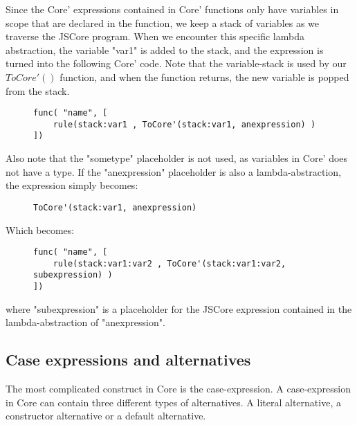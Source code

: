 Since the Core' expressions contained in Core' functions only have variables in 
scope that are declared in the function, we keep a stack of variables as we traverse
the JSCore program. When we encounter this specific lambda abstraction, the variable
"var1" is added to the stack, and the expression is turned into the following Core' code. 
Note that the variable-stack is used by our $ToCore'()$ function, and when
the function returns, the new variable is popped from the stack.

\begin{figure}[H]
\lstset{ %
language=Haskell,
}
\begin{lstlisting}
func( "name", [
    rule(stack:var1 , ToCore'(stack:var1, anexpression) )
])
\end{lstlisting}
\end{figure}

Also note that the "sometype" placeholder is not used, as variables in Core' does
not have a type. If the "anexpression" placeholder is also a lambda-abstraction, the
expression simply becomes:

\begin{figure}[H]
\lstset{ %
language=Haskell,
}
\begin{lstlisting}
ToCore'(stack:var1, anexpression)
\end{lstlisting}
\end{figure}

Which becomes:

\begin{figure}[H]
\lstset{ %
language=Haskell,
}
\begin{lstlisting}
func( "name", [
    rule(stack:var1:var2 , ToCore'(stack:var1:var2, subexpression) )
])
\end{lstlisting}
\end{figure}

where "subexpression" is a placeholder for the JSCore expression contained in the 
lambda-abstraction of "anexpression".


\subsection*{Case expressions and alternatives}

The most complicated construct in Core is the case-expression. A case-expression
in Core can contain three different types of alternatives. A literal alternative,
a constructor alternative or a default alternative. 

